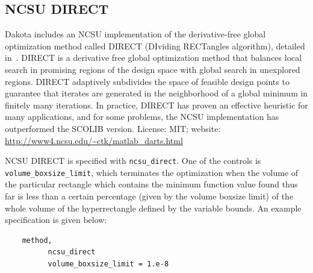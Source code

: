 


\subsection{NCSU DIRECT}\label{opt:software:ncsu}

Dakota includes an NCSU implementation of the derivative-free global
optimization method called DIRECT (DIviding RECTangles algorithm),
detailed in~\cite{Gab01}. DIRECT is a derivative free global
optimization method that balances local search in promising regions of
the design space with global search in unexplored regions.  DIRECT
adaptively subdivides the space of feasible design points to guarantee
that iterates are generated in the neighborhood of a global minimum in
finitely many iterations.  In practice, DIRECT has proven an effective
heuristic for many applications, and for some problems, the NCSU
implementation has outperformed the SCOLIB version.  License: MIT;
website: \url{http://www4.ncsu.edu/~ctk/matlab_darts.html}

NCSU DIRECT is specified with \texttt{ncsu\_direct}. One of the
controls is \texttt{volume\_boxsize\_limit}, which terminates the
optimization when the volume of the particular rectangle which contains
the minimum function value found thus far
is less than a certain percentage (given by the volume boxsize limit) of
the whole volume of the hyperrectangle defined by the variable bounds.
An example specification is given below:
\begin{small}
\begin{verbatim}
    method,
          ncsu_direct
          volume_boxsize_limit = 1.e-8
\end{verbatim}
\end{small}

